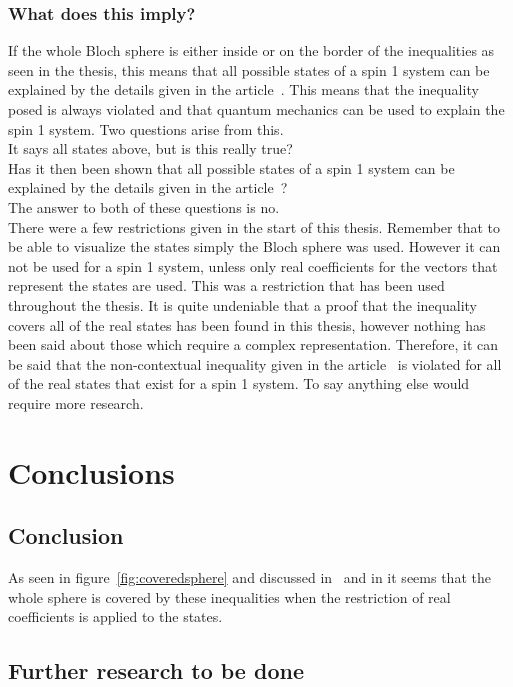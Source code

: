 \documentclass[
  utf8,%
  parskip,%
  largesmallcaps,intlimits,widermath,%
  sharecounter,nobreak,definition=marks,%
  noparts%
]{rtthesis}
\begin{document}
\subsection{What does this imply?}
If the whole Bloch sphere is either inside or on the border of the inequalities as seen in the thesis, this means that all possible states of a spin 1 system can be explained by the details given in the article~\cite{PhysRevLett.101.020403}. This means that the inequality posed is always violated  and that quantum mechanics can be used to explain the spin 1 system.
Two questions arise from this.\\
It says all states above, but is this really true?\\
Has it then been shown that all possible states of a spin 1 system can be explained by the details given in the article~\cite{PhysRevLett.101.020403}?\\
The answer to both of these questions is no.\\
There were a few restrictions given in the start of this thesis. Remember that to be able to visualize the states simply the Bloch sphere was used. However it can not be used for a spin 1 system, unless only real coefficients for the vectors that represent the states are used. This was a restriction that has been used throughout the thesis. It is quite undeniable that a proof that the inequality covers all of the real states has been found in this thesis, however nothing has been said about those which require a complex representation. Therefore, it can be said that the non-contextual inequality given in the article~\cite{PhysRevLett.101.020403} is violated for all of the real states that exist for a spin 1 system. To say anything else would require more research.


\chapter{Conclusions}\label{cha:conclusions}
\newpage
\section{Conclusion}
As seen in figure~\ref{fig:coveredsphere} and discussed in~ and in  it seems that the whole sphere is covered by these inequalities when the restriction of real coefficients is applied to the states.  

\section{Further research to be done}
\end{document}
